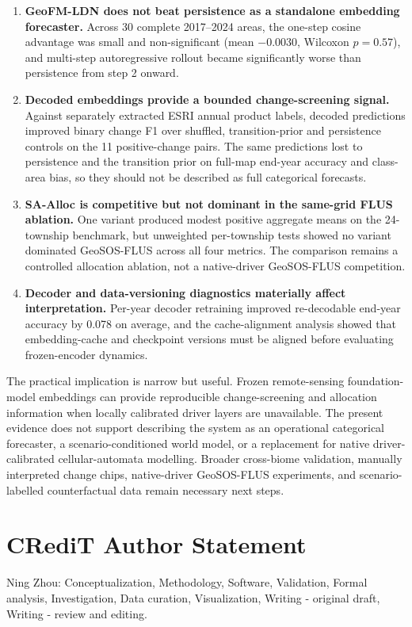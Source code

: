 \documentclass{article}
\begin{document}
\begin{enumerate}
\item \textbf{GeoFM-LDN does not beat persistence as a standalone embedding forecaster.} Across 30 complete 2017--2024 areas, the one-step cosine advantage was small and non-significant (mean $-0.0030$, Wilcoxon $p=0.57$), and multi-step autoregressive rollout became significantly worse than persistence from step 2 onward.

\item \textbf{Decoded embeddings provide a bounded change-screening signal.} Against separately extracted ESRI annual product labels, decoded predictions improved binary change F1 over shuffled, transition-prior and persistence controls on the 11 positive-change pairs. The same predictions lost to persistence and the transition prior on full-map end-year accuracy and class-area bias, so they should not be described as full categorical forecasts.

\item \textbf{SA-Alloc is competitive but not dominant in the same-grid FLUS ablation.} One variant produced modest positive aggregate means on the 24-township benchmark, but unweighted per-township tests showed no variant dominated GeoSOS-FLUS across all four metrics. The comparison remains a controlled allocation ablation, not a native-driver GeoSOS-FLUS competition.

\item \textbf{Decoder and data-versioning diagnostics materially affect interpretation.} Per-year decoder retraining improved re-decodable end-year accuracy by 0.078 on average, and the cache-alignment analysis showed that embedding-cache and checkpoint versions must be aligned before evaluating frozen-encoder dynamics.
\end{enumerate}

The practical implication is narrow but useful. Frozen remote-sensing foundation-model embeddings can provide reproducible change-screening and allocation information when locally calibrated driver layers are unavailable. The present evidence does not support describing the system as an operational categorical forecaster, a scenario-conditioned world model, or a replacement for native driver-calibrated cellular-automata modelling. Broader cross-biome validation, manually interpreted change chips, native-driver GeoSOS-FLUS experiments, and scenario-labelled counterfactual data remain necessary next steps.


\section*{CRediT Author Statement}
Ning Zhou: Conceptualization, Methodology, Software, Validation, Formal analysis, Investigation, Data curation, Visualization, Writing - original draft, Writing - review and editing.
\end{document}
